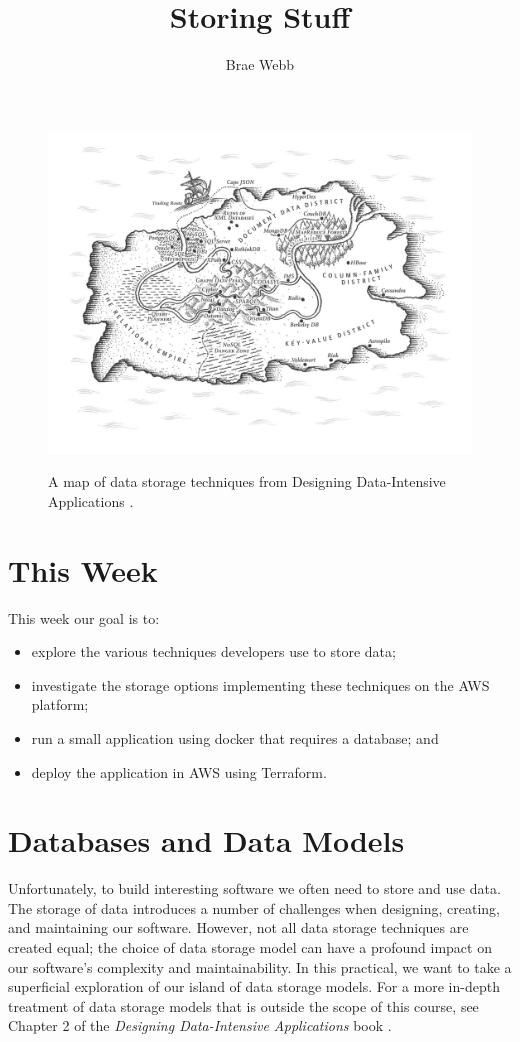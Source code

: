 \documentclass{csse4400}
\title{Storing Stuff}
\author{Brae Webb}
\date{\week{3}}
\begin{document}
\maketitle

\begin{figure}[h]
  \href{https://www.oreilly.com/library/view/designing-data-intensive-applications/9781491903063/ch02.html}{
    \includegraphics[width=\textwidth]{images/databases}
  }
\caption{A map of data storage techniques from Designing Data-Intensive Applications \cite{data-intensive}.}
\end{figure}

\section{This Week}
This week our goal is to:
\begin{itemize}
  \item explore the various techniques developers use to store data;
  \item investigate the storage options implementing these techniques on the AWS platform;
  \item run a small application using docker that requires a database; and
  \item deploy the application in AWS using Terraform.
\end{itemize}

\section{Databases and Data Models}
Unfortunately, to build interesting software we often need to store and use data.
The storage of data introduces a number of challenges when designing, creating, and maintaining our software.
However, not all data storage techniques are created equal;
the choice of data storage model can have a profound impact on our software's complexity and maintainability.
In this practical, we want to take a superficial exploration of our island of data storage models.
For a more in-depth treatment of data storage models that is outside the scope of this course,
see Chapter 2 of the \textit{Designing Data-Intensive Applications} book \cite{data-intensive}.
\end{document}
